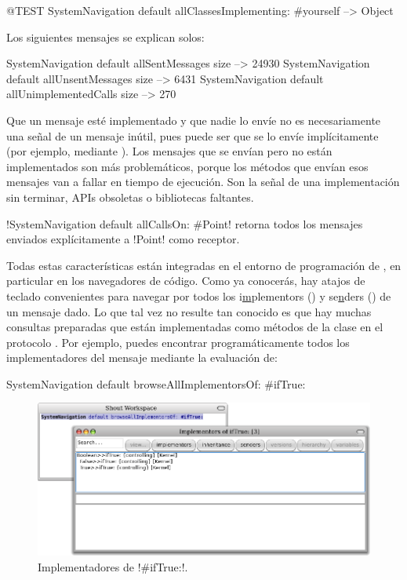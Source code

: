 \documentclass[a4paper,10pt,twoside]{book}
\begin{document}
\begin{code}{@TEST}
SystemNavigation default allClassesImplementing: #yourself --> {Object}
\end{code}

Los siguientes mensajes se explican solos:

\begin{code}{}
SystemNavigation default allSentMessages size          --> 24930
SystemNavigation default allUnsentMessages size      --> 6431
SystemNavigation default allUnimplementedCalls size --> 270
\end{code}

Que un mensaje esté implementado y que nadie lo envíe no es
necesariamente una señal de un mensaje inútil, pues puede ser que se
lo envíe implícitamente (por ejemplo, mediante ).  Los
mensajes que se envían pero no están implementados son más
problemáticos, porque los métodos que envían esos mensajes van a
fallar en tiempo de ejecución.  Son la señal de una implementación sin
terminar, APIs obsoletas o bibliotecas faltantes.

\ct!SystemNavigation default allCallsOn: #Point! retorna todos los
mensajes enviados explícitamente a \ct!Point! como receptor.

Todas estas características están integradas en el entorno de
programación de \pharo, en particular en los navegadores de código.
Como ya conocerás, hay atajos de teclado convenientes para navegar por
todos los i\underline{m}plementors () y se\underline{n}ders
() de un mensaje dado.  Lo que tal vez no resulte tan
conocido es que hay muchas consultas preparadas que están
implementadas como métodos de la clase  en el
protocolo .  Por ejemplo, puedes encontrar
programáticamente todos los implementadores del mensaje 
mediante la evaluación de:
\begin{code}{}
SystemNavigation default browseAllImplementorsOf: #ifTrue:
\end{code}

\begin{figure}[ht]\centering
        \includegraphics[width=\linewidth]{implementors}
        \caption{Implementadores de \ct!\#ifTrue:!.}
\end{figure}
\end{document}
